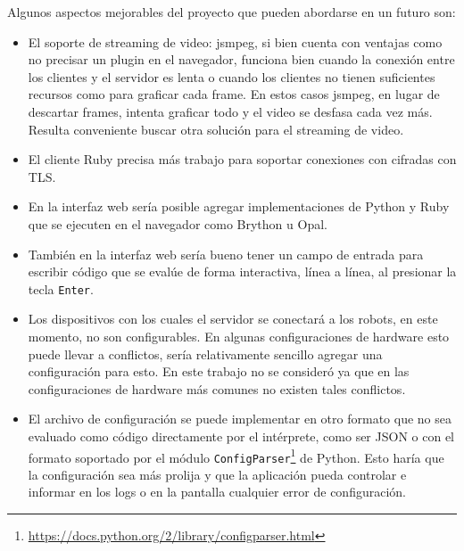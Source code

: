 Algunos aspectos mejorables del proyecto que pueden abordarse en un futuro
son:
\begin{itemize}
    \item El soporte de streaming de video: jsmpeg, si bien cuenta con
        ventajas como no precisar un plugin en el navegador, funciona
        bien cuando la conexión entre los clientes y el servidor es
        lenta o cuando los clientes no tienen suficientes recursos como
        para graficar cada frame. En estos casos jsmpeg, en lugar de
        descartar frames, intenta graficar todo y el video se desfasa
        cada vez más. Resulta conveniente buscar otra solución para el
        streaming de video.
    \item El cliente Ruby precisa más trabajo para soportar conexiones
        con cifradas con TLS.
    \item En la interfaz web sería posible agregar implementaciones
        de Python y Ruby que se ejecuten en el navegador como
        Brython u Opal.
    \item También en la interfaz web sería bueno tener un campo de entrada
        para escribir código que se evalúe de forma interactiva, línea
        a línea, al presionar la tecla \texttt{Enter}.
    \item Los dispositivos con los cuales el servidor se conectará a
        los robots, en este momento, no son configurables. En algunas
        configuraciones de hardware esto puede llevar a conflictos,
        sería relativamente sencillo agregar una configuración para
        esto. En este trabajo no se consideró ya que en las configuraciones
        de hardware más comunes no existen tales conflictos.
    \item El archivo de configuración se puede implementar en otro formato
        que no sea evaluado como código directamente por el intérprete, como
        ser JSON o con el formato soportado por el módulo
        \texttt{ConfigParser}\footnote{\url{https://docs.python.org/2/library/configparser.html}}
        de Python. Esto haría que la configuración sea más prolija y
        que la aplicación pueda controlar e informar en los logs o en la
        pantalla cualquier error de configuración.
\end{itemize}
